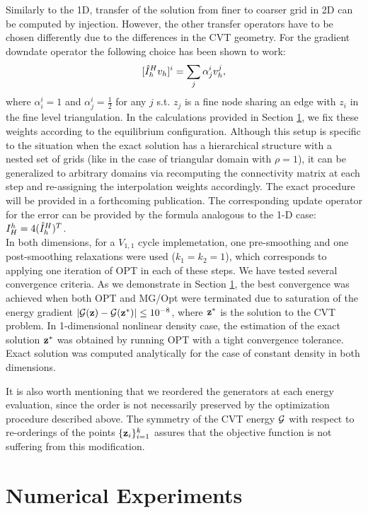 \documentclass{siamltex}
\begin{document}
Similarly to the 1D, transfer of the solution from finer to coarser grid in 2D can be computed by injection. However, the other transfer operators have to be chosen differently due to the differences in the CVT geometry. For the gradient downdate operator the following choice has been shown to work:
$$
[{\hat I}_h^H v_{h}]^{i} = \sum_{j}{\alpha^i_j v_{h}^{j}},
$$
where $\alpha^i_i=1$ and $\alpha^i_j=\frac{1}{2}$ for any $j$ s.t. $z_j$ is a fine node sharing an edge with $z_i$ in the fine level triangulation. In the calculations provided in Section \ref{num}, we fix these weights according to the equilibrium configuration. Although this setup is specific to the situation  when the exact solution has a hierarchical structure with a nested set of grids (like in the case of triangular domain with $\rho=1$), it can be generalized to arbitrary domains via recomputing the connectivity matrix at each step and re-assigning the interpolation weights accordingly. The exact procedure will be provided in a forthcoming publication. The corresponding update operator for the error can be provided by the formula analogous to the 1-D case: $I_H^h=4({\hat I}_h^H)^T$.\\

In both dimensions, for a $V_{1,1}$ cycle implemetation, one pre-smoothing and one post-smoothing relaxations were used ($k_1=k_2=1$), which corresponds to applying one iteration of OPT in each of these steps. We have tested several convergence criteria. As we demonstrate in Section \ref{num}, the best convergence was achieved when both OPT and MG/Opt were terminated due to saturation of the energy gradient $|\cg(\bz)-\cg(\bz^{*})| \le 10^{-8}$, where ${\bf z}^{*}$ is the solution to the CVT problem.  In 1-dimensional nonlinear density case, the estimation of the exact solution ${\bf z}^{*}$ was obtained by running OPT with a tight convergence tolerance. Exact solution was computed analytically for the case of constant density in both dimensions.

It is also worth mentioning that we reordered the generators at each energy evaluation, since the order is not necessarily preserved by the optimization procedure described above. The symmetry of the CVT energy $\cg$ with respect to re-orderings of the points $\{{{\bf z}}_i\}_{i=1}^k$ assures that the objective function is not suffering from this modification.\\

 

\section{Numerical Experiments}
\label{num}
\end{document}
